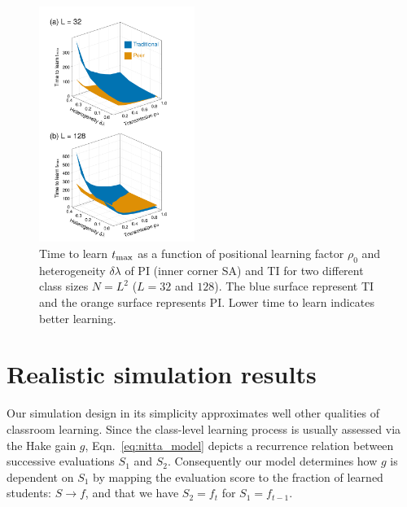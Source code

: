 \documentclass[twocolumn,secnumarabic,amssymb, nobibnotes, aps, prd]{revtex4-2}
\begin{document}
        \begin{figure}[htbp!]
            \centering
            \includegraphics[width=0.45\textwidth]{figures/figure5.png}
            \caption{Time to learn $t_{\rm max}$ as a function of positional learning factor $\rho_0$ and heterogeneity $\delta\lambda$ of PI (inner corner SA) and TI for two different class sizes $N=L^2$ ($L=32$ and $128$).
            The blue surface represent TI and the orange surface represents PI.
            Lower time to learn indicates better learning.}
            \label{fig:Params effect summary t}
        \end{figure}

\section{Realistic simulation results}

    Our simulation design in its simplicity approximates well other qualities of classroom learning.
    Since the class-level learning process is usually assessed via the Hake gain $g$, Eqn.~\ref{eq:nitta_model} depicts a recurrence relation between successive evaluations $S_1$ and $S_2$.
    Consequently our model determines how $g$ is dependent on $S_1$ by mapping the evaluation score to the fraction of learned students: ${S}\rightarrow{f}$, and that we have $S_2=f_{t}$ for $S_1=f_{t-1}$.
\end{document}

